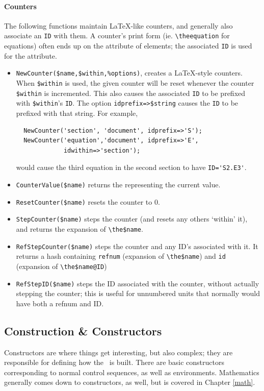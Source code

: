 \documentclass{book}
\begin{document}
\paragraph{Counters}
The following functions maintain \LaTeX-like counters, and generally
also associate an \texttt{ID} with them.  A counter's print form
(ie. \verb|\theequation| for equations) often ends up on the  attribute
of elements; the associated \texttt{ID} is used for the  attribute.
\begin{itemize}
\item \verb|NewCounter($name,$within,%options)|,
  creates a \LaTeX-style counters.  When \verb|$within| is used, 
  the given counter will be reset whenever the counter \verb|$within| is incremented.
  This also causes the associated \texttt{ID} to be prefixed with \verb|$within|'s \texttt{ID}.
  The option \verb|idprefix=>$string| causes the \texttt{ID} to be prefixed with that string.
  For example,
\begin{verbatim}
  NewCounter('section', 'document', idprefix=>'S');
  NewCounter('equation','document', idprefix=>'E',
             idwithin=>'section');
\end{verbatim}
would cause the third equation in the second section to have \verb|ID='S2.E3'|.
\item  \verb|CounterValue($name)| returns the  representing the current value.
\item  \verb|ResetCounter($name)| resets the counter to 0.
\item \verb|StepCounter($name)| steps the counter (and resets any others `within' it),
  and returns the expansion of \verb|\the$name|.
\item \verb|RefStepCounter($name)| steps the counter and any ID's associated with it.
  It returns a hash containing \texttt{refnum} (expansion of \verb|\the$name|)
  and \texttt{id} (expansion of \verb|\the$name@ID|)
\item \verb|RefStepID($name)| steps the ID associated with the counter, without
  actually stepping the counter; this is useful for unnumbered units that normally
  would have both a refnum and ID.
\end{itemize}

\subsection[Construction]{Construction \& Constructors}\label{customization.latexml.construction}
Constructors are where things get interesting, but also complex; they are
responsible for defining how the \XML\ is built.  There are basic
constructors corresponding to normal control sequences, as well as
environments. Mathematics generally comes down to constructors, as well,
but is covered in Chapter \ref{math}.
\end{document}
